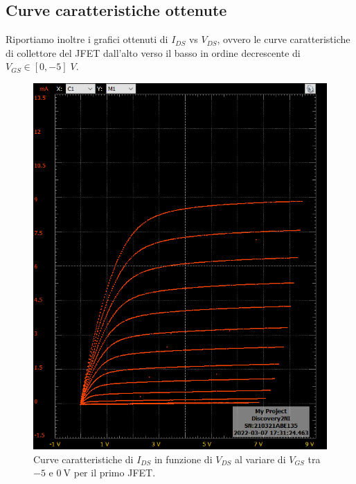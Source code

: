 \documentclass[10pt, a4paper, italian]{article}
\begin{document}
\subsection{Curve caratteristiche ottenute}
Riportiamo inoltre i grafici ottenuti di $I_{DS}$ vs $V_{DS}$, ovvero le
curve caratteristiche di collettore del JFET dall'alto verso il basso in
ordine decrescente di $V_{GS} \in [0, -5]\; \si{V}$.
\begin{figure}[htbp]
    \centering
	\includegraphics[scale=0.6]{xy}
    \caption{Curve caratteristiche di $I_{DS}$ in funzione di $V_{DS}$ al
    variare di $V_{GS}$ tra $-5$ e $\SI{0}{\V}$ per il primo JFET.
    \label{fig: IDS-VDS1}}
\end{figure}
\end{document}
